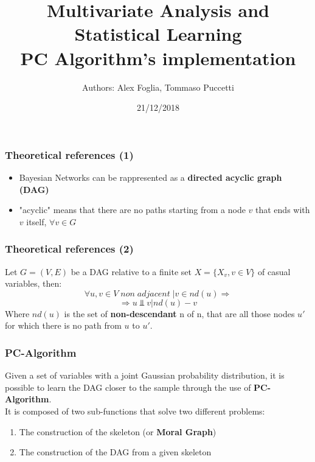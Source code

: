 \documentclass[xcolor ={table,usenames,dvipsnames}]{beamer}
\title{Multivariate Analysis and Statistical Learning \\PC Algorithm's implementation}
\author{Authors: Alex Foglia, Tommaso Puccetti}
\institute{Universit\`a  degli Studi di Firenze}
\date{21/12/2018}
\theoremstyle{definition}
\begin{document}
	
	\begin{frame}
		\maketitle
	\end{frame}

	\begin{frame}
		\frametitle{Theoretical references (1)}
		\begin{itemize}
			\item Bayesian Networks can be rappresented as a \textbf{directed acyclic graph (DAG)}
			\item "acyclic" means that there are no paths starting from a node $v$ that ends with $v$ itself, $\forall v \in G$
			
		\end{itemize}
	\end{frame}

	\begin{frame}
		\frametitle{Theoretical references (2)}
		Let $G = (V,E)$ be a DAG relative to a finite set  $X = \{X_{v}, v \in V\}$ of casual variables, then:
		$$
		\forall u,v \in V \;non\;adjacent\;| v \in nd(u) \Rightarrow 
		$$
		$$\Rightarrow u \Perp v | nd(u) - v $$
	Where $nd(u)$ is the set of \textbf{non-descendant} n of n, that are all those nodes $u'$ for which there is no path from $u$ to $u'$. \\
	\end{frame}

	\begin{frame}
		\frametitle{PC-Algorithm}
		Given a set of variables with a joint Gaussian probability distribution, it is possible to learn the DAG closer to the sample through the use of  \textbf{PC-Algorithm}. \\
		It is composed of two sub-functions that solve two different problems:
		\begin{enumerate}
			\item The construction of the skeleton (or \textbf{Moral Graph})
			\item The construction of the DAG from a given skeleton
		\end{enumerate}
	\end{frame}
\end{document}
